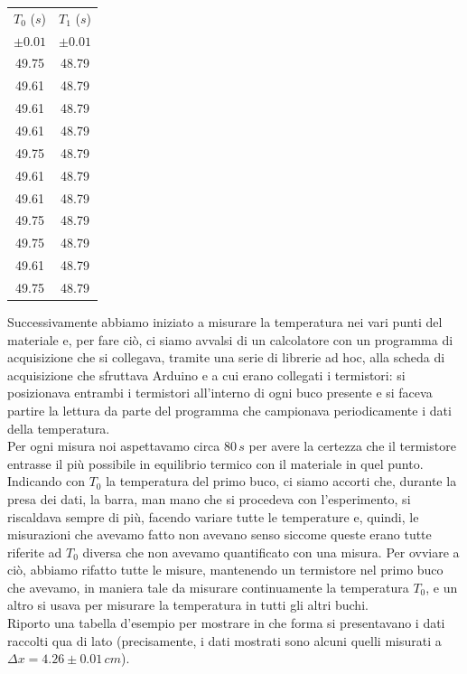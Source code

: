 \documentclass{article}
\begin{document}
\begin{table}
\centering
\begin{tabular}{c c} \toprule
$T_0$ ($s$) & $T_1$ ($s$) \\
$\pm 0.01$ & $\pm 0.01$ \\ \toprule
49.75 &	48.79 \\ \midrule
49.61 &	48.79 \\ \midrule
49.61 &	48.79 \\ \midrule
49.61 &	48.79 \\ \midrule
49.75 &	48.79 \\ \midrule
49.61 &	48.79 \\ \midrule
49.61 &	48.79 \\ \midrule
49.75 &	48.79 \\ \midrule
49.75 &	48.79 \\ \midrule
49.61 &	48.79 \\ \midrule
49.75 &	48.79 \\ \bottomrule
\end{tabular}
\end{table}

\noindent Successivamente abbiamo iniziato a misurare la temperatura nei vari punti del materiale e, per fare ciò, ci siamo avvalsi di un calcolatore con un programma di acquisizione che si collegava, tramite una serie di librerie ad hoc, alla scheda di acquisizione che sfruttava Arduino e a cui erano collegati i termistori: si posizionava entrambi i termistori all'interno di ogni buco presente e si faceva partire la lettura da parte del programma che campionava periodicamente i dati della temperatura. \\
Per ogni misura noi aspettavamo circa $80 \, \unit{s}$ per avere la certezza che il termistore entrasse il più possibile in equilibrio termico con il materiale in quel punto. \\
Indicando con $T_0$ la temperatura del primo buco, ci siamo accorti che, durante la presa dei dati, la barra, man mano che si procedeva con l'esperimento, si riscaldava sempre di più, facendo variare tutte le temperature e, quindi, le misurazioni che avevamo fatto non avevano  senso siccome queste erano tutte riferite ad $T_0$ diversa che non avevamo quantificato con una misura. Per ovviare a ciò, abbiamo rifatto tutte le misure, mantenendo un termistore nel primo buco che avevamo, in maniera tale da misurare continuamente la temperatura $T_0$, e un altro si usava per misurare la temperatura in tutti gli altri buchi. \\
Riporto una tabella d'esempio per mostrare in che forma si presentavano i dati raccolti qua di lato (precisamente, i dati mostrati sono alcuni quelli misurati a $\Delta x = 4.26 \pm 0.01 \, \unit{cm}$). \\
\clearpage
\newpage
\end{document}
